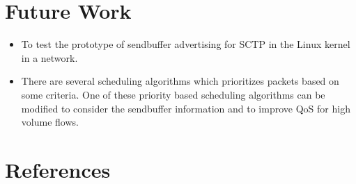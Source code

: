 \documentclass{beamer}
\begin{document}
\section{Future Work}
\begin{frame}{\insertsection}
\begin{itemize}
\item To test the prototype of sendbuffer advertising for SCTP in the Linux kernel in a network.
\item There are several scheduling algorithms which prioritizes packets based on some
criteria. One of these priority based scheduling algorithms can be modified to consider
the sendbuffer information and to improve QoS for high volume flows.
\end{itemize}
\end{frame}

\section{References}
\begin{frame}[allowframebreaks]
\frametitle<presentation>{\insertsection}
\nocite{*}
\printbibliography
\end{frame}
\end{document}
